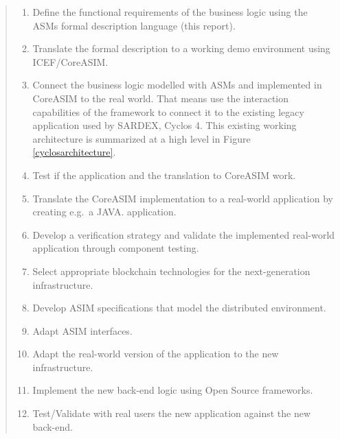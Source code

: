 \begin{quote}
\small
\begin{enumerate}
	\item Define the functional requirements of the business logic using the ASMs formal description language (this report).
	\item Translate the formal description to a working demo environment using ICEF/CoreASIM.
	\item Connect the business logic modelled with ASMs and implemented in CoreASIM to the real world. That means use the interaction capabilities of the framework to connect it to the existing legacy application used by SARDEX, Cyclos 4. This existing working architecture is summarized at a high level in Figure \ref{cyclosarchitecture}.
	\item Test if the application and the translation to CoreASIM work.
	\item Translate the CoreASIM implementation to a real-world application by creating e.g.\ a JAVA. application.
	\item Develop a verification strategy and validate the implemented real-world application through component testing.
	\item Select appropriate blockchain technologies for the next-generation infrastructure.
	\item Develop ASIM specifications that model the distributed environment.
	\item Adapt ASIM interfaces.
	\item Adapt the real-world version of the application to the new infrastructure.
	\item Implement the new back-end logic using Open Source frameworks.
	\item Test/Validate with real users the new application against the new back-end.
\end{enumerate}
\end{quote}




